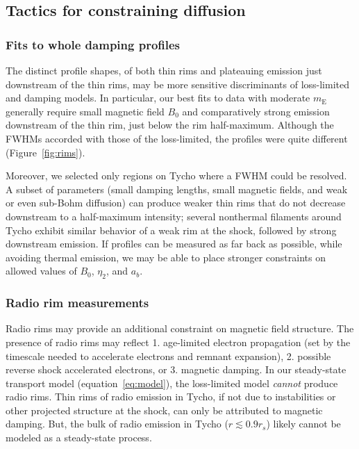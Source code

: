 \documentclass[iop, apj, numberedappendix]{emulateapj}
\newcommand*{\mt}{\mathrm}
\newcommand*{\mE}{m_\mt{E}}
\begin{document}
\subsection{Tactics for constraining diffusion}

\subsubsection{Fits to whole damping profiles}

The distinct profile shapes, of both thin rims and plateauing emission just
downstream of the thin rims, may be more sensitive discriminants of
loss-limited and damping models.  In particular, our best fits to data with
moderate $\mE$ generally require small magnetic field $B_0$ and comparatively
strong emission downstream of the thin rim, just below the rim half-maximum.
Although the FWHMs accorded with those of the loss-limited, the profiles were
quite different (Figure~\ref{fig:rims}).

Moreover, we selected only regions on Tycho where a FWHM could be resolved.
A subset of parameters (small damping lengths, small magnetic fields, and weak
or even sub-Bohm diffusion) can produce weaker thin rims that do not decrease
downstream to a half-maximum intensity; several nonthermal filaments around
Tycho exhibit similar behavior of a weak rim at the shock, followed by strong
downstream emission.  If profiles can be measured as far back as possible,
while avoiding thermal emission, we may be able to place stronger constraints
on allowed values of $B_0$, $\eta_2$, and $a_b$.

\subsubsection{Radio rim measurements}

Radio rims may provide an additional constraint on magnetic field structure.
The presence of radio rims may reflect 1. age-limited electron propagation (set
by the timescale needed to accelerate electrons and remnant expansion), 2.
possible reverse shock accelerated electrons, or 3. magnetic damping.  In our
steady-state transport model (equation~\eqref{eq:model}), the loss-limited
model \emph{cannot} produce radio rims.  Thin rims of radio emission in Tycho,
if not due to instabilities or other projected structure at the shock, can only
be attributed to magnetic damping.  But, the bulk of radio emission in Tycho
($r \lesssim 0.9 r_s$) likely cannot be modeled as a steady-state process.
\end{document}
